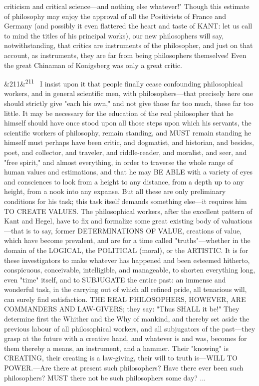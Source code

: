 \documentclass[12pt]{article}
\newcommand{\para}[1][]{\par\noindent\ifx&#1&\else\textsuperscript{\footnotesize #1}~\fi}
\begin{document}
criticism and critical science---and nothing else whatever!" Though this estimate of philosophy may enjoy the approval of all the Positivists of France and Germany (and possibly it even flattered the heart and taste of KANT: let us call to mind the titles of his principal works), our new philosophers will say, notwithstanding, that critics are instruments of the philosopher, and just on that account, as instruments, they are far from being philosophers themselves! Even the great Chinaman of Konigsberg was only a great critic.

\para[211] I insist upon it that people finally cease confounding philosophical workers, and in general scientific men, with philosophers---that precisely here one should strictly give "each his own," and not give those far too much, these far too little. It may be necessary for the education of the real philosopher that he himself should have once stood upon all those steps upon which his servants, the scientific workers of philosophy, remain standing, and MUST remain standing he himself must perhaps have been critic, and dogmatist, and historian, and besides, poet, and collector, and traveler, and riddle-reader, and moralist, and seer, and "free spirit," and almost everything, in order to traverse the whole range of human values and estimations, and that he may BE ABLE with a variety of eyes and consciences to look from a height to any distance, from a depth up to any height, from a nook into any expanse. But all these are only preliminary conditions for his task; this task itself demands something else---it requires him TO CREATE VALUES. The philosophical workers, after the excellent pattern of Kant and Hegel, have to fix and formalize some great existing body of valuations---that is to say, former DETERMINATIONS OF VALUE, creations of value, which have become prevalent, and are for a time called "truths"---whether in the domain of the LOGICAL, the POLITICAL (moral), or the ARTISTIC. It is for these investigators to make whatever has happened and been esteemed hitherto, conspicuous, conceivable, intelligible, and manageable, to shorten everything long, even "time" itself, and to SUBJUGATE the entire past: an immense and wonderful task, in the carrying out of which all refined pride, all tenacious will, can surely find satisfaction. THE REAL PHILOSOPHERS, HOWEVER, ARE COMMANDERS AND LAW-GIVERS; they say: "Thus SHALL it be!" They determine first the Whither and the Why of mankind, and thereby set aside the previous labour of all philosophical workers, and all subjugators of the past---they grasp at the future with a creative hand, and whatever is and was, becomes for them thereby a means, an instrument, and a hammer. Their "knowing" is CREATING, their creating is a law-giving, their will to truth is---WILL TO POWER.---Are there at present such philosophers? Have there ever been such philosophers? MUST there not be such philosophers some day? ...
\end{document}
